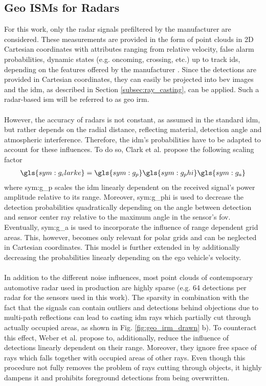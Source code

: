 \subsection{Geo ISMs for Radars}
\label{subsec:geo_ism_radar}
For this work, only the radar signals prefiltered by the manufacturer are considered. These measurements are provided in the form of point clouds in 2D Cartesian coordinates with attributes ranging from relative velocity, false alarm probabilities, dynamic states (e.g. oncoming, crossing, etc.) up to track ids, depending on the features offered by the manufacturer \cite{caesar2020nuscenes}. Since the detections are provided in Cartesian coordinates, they can easily be projected into \gls{bev} images and the \gls{idm}, as described in Section \ref{subsec:ray_casting}, can be applied. Such a radar-based \gls{ism} will be referred to as geo \gls{irm}.
\\\\
However, the accuracy of radars is not constant, as assumed in the standard \gls{idm}, but rather depends on the radial distance, reflecting material, detection angle and atmospheric interference. Therefore, the \gls{idm}'s probabilities have to be adapted to account for these influences. To do so, Clark et al. \cite{clarke2012sensor} propose the following scaling factor
\begin{align}
	\label{eq:clarke_scaling}
	\gls{sym:g_clarke} = \gls{sym:g_p} \gls{sym:g_phi} \gls{sym:g_a}
\end{align}
where \gls{sym:g_p} scales the \gls{idm} linearly dependent on the received signal's power amplitude relative to its range. Moreover, \gls{sym:g_phi} is used to decrease the detection probabilities quadratically depending on the angle between detection and sensor center ray relative to the maximum angle in the sensor's \gls{fov}. Eventually, \gls{sym:g_a} is used to incorporate the influence of range dependent grid areas. This, however, becomes only relevant for polar grids and can be neglected in Cartesian coordinates. This model is further extended in \cite{prophet2018adaptions} by additionally decreasing the probabilities linearly depending on the ego vehicle's velocity.
\\\\
In addition to the different noise influences, most point clouds of contemporary automotive radar used in production are highly sparse (e.g. 64 detections per radar for the sensors used in this work). The sparsity in combination with the fact that the signals can contain outliers and detections behind objections due to multi-path reflections can lead to casting \gls{idm} rays which partially cut through actually occupied areas, as shown in Fig. \ref{fig:geo_irm_drawn} b). To counteract this effect, Weber et al. \cite{werber2015automotive} propose to, additionally, reduce the influence of detections linearly dependent on their range. Moreover, they ignore free space of rays which falls together with occupied areas of other rays. Even though this procedure not fully removes the problem of rays cutting through objects, it highly dampens it and prohibits foreground detections from being overwritten.
